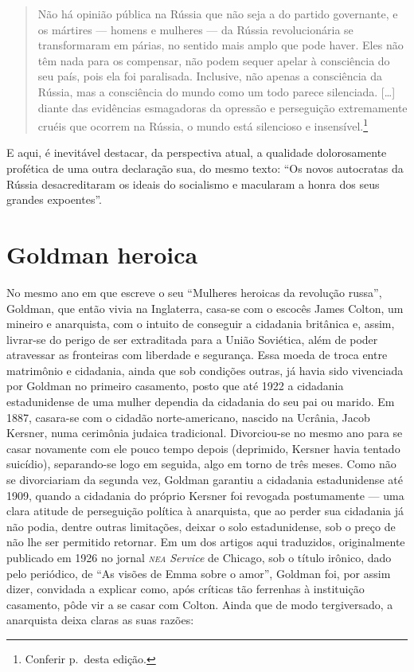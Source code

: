 \begin{quote}
Não há opinião pública na Rússia que não seja a do partido governante, e
os mártires --- homens e mulheres --- da Rússia revolucionária se
transformaram em párias, no sentido mais amplo que pode haver. Eles não
têm nada para os compensar, não podem sequer apelar à consciência do seu
país, pois ela foi paralisada. Inclusive, não apenas a consciência da
Rússia, mas a consciência do mundo como um todo parece silenciada.
{[}\ldots{]} diante das evidências esmagadoras da opressão e perseguição
extremamente cruéis que ocorrem na Rússia, o mundo está silencioso e
insensível.\footnote{Conferir p.\,\pageref{ref2} desta edição.}
\end{quote}

E aqui, é inevitável destacar, da perspectiva atual, a
qualidade dolorosamente profética de uma outra declaração sua, do mesmo texto: ``Os novos autocratas da Rússia desacreditaram os
ideais do socialismo e macularam a honra dos seus grandes expoentes''.

\section{Goldman heroica}

No mesmo ano em que escreve o seu ``Mulheres heroicas da revolução
russa'', Goldman, que então vivia na Inglaterra, casa-se com o escocês
James Colton, um mineiro e anarquista, com o intuito de conseguir a
cidadania britânica e, assim, livrar-se do perigo de ser
extraditada para a União Soviética, além de poder atravessar as
fronteiras com liberdade e segurança. Essa moeda de troca entre
matrimônio e cidadania, ainda que sob condições outras, já havia sido
vivenciada por Goldman no primeiro casamento, posto que até 1922 a
cidadania estadunidense de uma mulher dependia da cidadania do seu pai
ou marido. Em 1887, casara-se com o cidadão norte-americano, nascido na
Ucrânia, Jacob Kersner, numa cerimônia judaica tradicional.
Divorciou-se no mesmo ano para se casar novamente com ele pouco tempo
depois (deprimido, Kersner havia tentado suicídio), separando-se logo em
seguida, algo em torno de três meses. Como não se divorciariam da
segunda vez, Goldman garantiu a cidadania estadunidense até 1909, quando a cidadania
do próprio Kersner foi revogada postumamente --- uma clara
atitude de perseguição política à anarquista, que ao perder
sua cidadania já não podia, dentre outras limitações,
deixar o solo estadunidense, sob o preço de não lhe ser permitido
retornar. Em um dos artigos aqui traduzidos, originalmente publicado em 1926 no
jornal \textit{\textsc{nea} Service} de Chicago, sob o título irônico, dado
pelo periódico, de ``As visões de Emma sobre o amor'', Goldman foi, por
assim dizer, convidada a explicar como, após críticas tão
ferrenhas à instituição casamento, pôde vir a se casar com Colton. Ainda
que de modo tergiversado, a anarquista deixa claras as suas razões:


